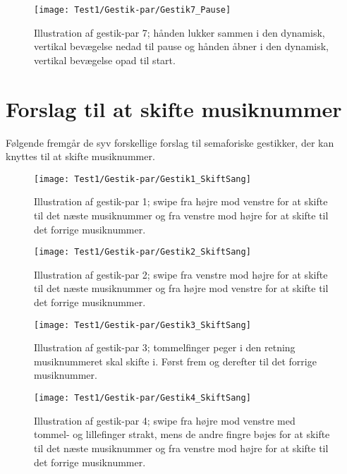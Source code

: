 \noindent
%
%
\begin{figure}[H]
	\centering
	\texttt{[image: Test1/Gestik-par/Gestik7\_Pause]}
	\caption{Illustration af gestik-par 7; hånden lukker sammen i den dynamisk, vertikal bevægelse nedad til pause og hånden åbner i den dynamisk, vertikal bevægelse opad til start.}
	\label{fig:GestikPar7Pause}
\end{figure}
\noindent
%


\section{Forslag til at skifte musiknummer}
\label{app:ForslagSkift}
%
Følgende fremgår de syv forskellige forslag til semaforiske gestikker, der kan knyttes til at skifte musiknummer.
%
\begin{figure}[H]
	\centering
	\texttt{[image: Test1/Gestik-par/Gestik1\_SkiftSang]}
	\caption{Illustration af gestik-par 1; swipe fra højre mod venstre for at skifte til det næste musiknummer og fra venstre mod højre for at skifte til det forrige musiknummer.}
	\label{fig:GestikPar1SkiftApp}
\end{figure}
\noindent
%
%
\begin{figure}[H]
	\centering
	\texttt{[image: Test1/Gestik-par/Gestik2\_SkiftSang]}
	\caption{Illustration af gestik-par 2; swipe fra venstre mod højre for at skifte til det næste musiknummer og fra højre mod venstre for at skifte til det forrige musiknummer.}
	\label{fig:GestikPar2SkiftApp}
\end{figure}
\noindent
%
\newpage
%
\begin{figure}[H]
	\centering
	\texttt{[image: Test1/Gestik-par/Gestik3\_SkiftSang]}
	\caption{Illustration af gestik-par 3; tommelfinger peger i den retning musiknummeret skal skifte i. Først frem og derefter til det forrige musiknummer.}
	\label{fig:GestikPar3SkiftApp}
\end{figure}
\noindent
%
%
\begin{figure}[H]
	\centering
	\texttt{[image: Test1/Gestik-par/Gestik4\_SkiftSang]}
	\caption{Illustration af gestik-par 4; swipe fra højre mod venstre med tommel- og lillefinger strakt, mens de andre fingre bøjes for at skifte til det næste musiknummer og fra venstre mod højre for at skifte til det forrige musiknummer.}
	\label{fig:GestikPar4SkiftApp}
\end{figure}
